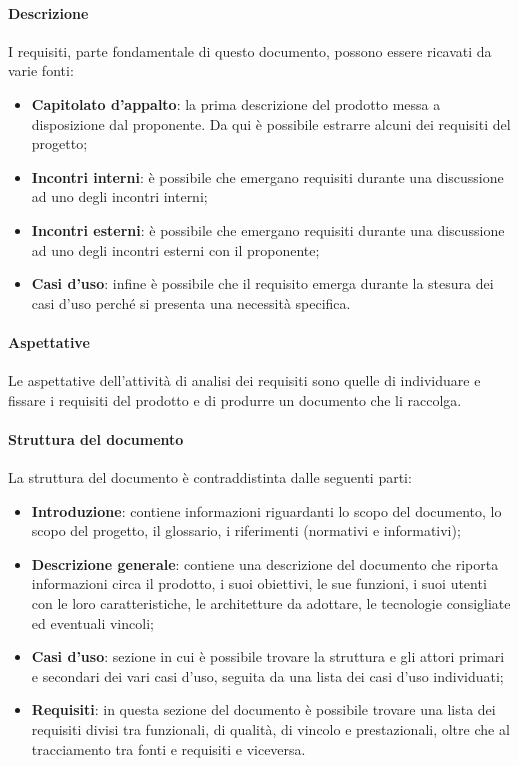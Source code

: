 \paragraph{Descrizione}

I requisiti, parte fondamentale di questo documento, possono essere ricavati da varie fonti:
\begin{itemize}
    \item \textbf{Capitolato d'appalto}: la prima descrizione del prodotto messa a disposizione dal proponente. Da qui
    è possibile estrarre alcuni dei requisiti del progetto;
    \item \textbf{Incontri interni}: è possibile che emergano requisiti durante una discussione ad uno degli incontri interni;
    \item \textbf{Incontri esterni}: è possibile che emergano requisiti durante una discussione ad uno degli incontri esterni con il proponente;
    \item \textbf{Casi d'uso}: infine è possibile che il requisito emerga durante la stesura dei casi d'uso perché si
    presenta una necessità specifica.
\end{itemize}

\paragraph{Aspettative}

Le aspettative dell'attività di analisi dei requisiti sono quelle di individuare e fissare i requisiti del prodotto e di
produrre un documento che li raccolga.

\paragraph{Struttura del documento}

La struttura del documento è contraddistinta dalle seguenti parti:
\begin{itemize}
    \item \textbf{Introduzione}: contiene informazioni riguardanti lo scopo del documento, lo scopo del progetto, il
    glossario, i riferimenti (normativi e informativi);
    \item \textbf{Descrizione generale}: contiene una descrizione del documento che riporta informazioni circa il
    prodotto, i suoi obiettivi, le sue funzioni, i suoi utenti con le loro caratteristiche, le architetture da adottare,
    le tecnologie consigliate ed eventuali vincoli;
    \item \textbf{Casi d'uso}: sezione in cui è possibile trovare la struttura e gli attori primari e secondari dei vari
    casi d'uso, seguita da una lista dei casi d'uso individuati;
    \item \textbf{Requisiti}: in questa sezione del documento è possibile trovare una lista dei requisiti divisi tra
    funzionali, di qualità, di vincolo e prestazionali, oltre che al tracciamento tra fonti e requisiti e viceversa.
\end{itemize}

